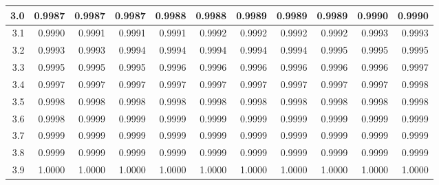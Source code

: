 \begin{center}
\begin{tabular}{|r|r@{\ }r@{\ }r@{\ }r@{\ }r@{\ }r@{\ }r@{\ }r@{\ }r@{\ }r@{\ }|}
    \hline
    3.0&0.9987&0.9987&0.9987&0.9988&0.9988&0.9989&0.9989&0.9989&0.9990&0.9990\\
    \hline
    3.1&0.9990&0.9991&0.9991&0.9991&0.9992&0.9992&0.9992&0.9992&0.9993&0.9993\\
    \hline
    3.2&0.9993&0.9993&0.9994&0.9994&0.9994&0.9994&0.9994&0.9995&0.9995&0.9995\\
    \hline
    3.3&0.9995&0.9995&0.9995&0.9996&0.9996&0.9996&0.9996&0.9996&0.9996&0.9997\\
    \hline
    3.4&0.9997&0.9997&0.9997&0.9997&0.9997&0.9997&0.9997&0.9997&0.9997&0.9998\\
    \hline
    3.5&0.9998&0.9998&0.9998&0.9998&0.9998&0.9998&0.9998&0.9998&0.9998&0.9998\\
    \hline
    3.6&0.9998&0.9999&0.9999&0.9999&0.9999&0.9999&0.9999&0.9999&0.9999&0.9999\\
    \hline
    3.7&0.9999&0.9999&0.9999&0.9999&0.9999&0.9999&0.9999&0.9999&0.9999&0.9999\\
    \hline
    3.8&0.9999&0.9999&0.9999&0.9999&0.9999&0.9999&0.9999&0.9999&0.9999&0.9999\\
    \hline
    3.9&1.0000&1.0000&1.0000&1.0000&1.0000&1.0000&1.0000&1.0000&1.0000&1.0000\\
    \hline
    \end{tabular}
\end{center}


